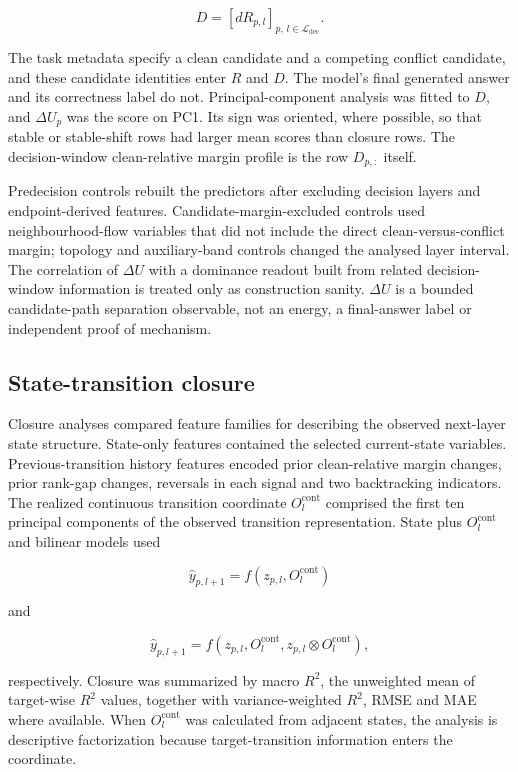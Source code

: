 \documentclass[12pt]{article}
\begin{document}
\[
D=\left[dR_{p,l}\right]_{p,\,l\in\mathcal{L}_{\mathrm{dec}}}.
\]

The task metadata specify a clean candidate and a competing conflict candidate, and these candidate identities enter \(R\) and \(D\). The model's final generated answer and its correctness label do not. Principal-component analysis was fitted to \(D\), and \(\Delta U_p\) was the score on PC1. Its sign was oriented, where possible, so that stable or stable-shift rows had larger mean scores than closure rows. The decision-window clean-relative margin profile is the row \(D_{p,:}\) itself.

Predecision controls rebuilt the predictors after excluding decision layers and endpoint-derived features. Candidate-margin-excluded controls used neighbourhood-flow variables that did not include the direct clean-versus-conflict margin; topology and auxiliary-band controls changed the analysed layer interval. The correlation of \(\Delta U\) with a dominance readout built from related decision-window information is treated only as construction sanity. \(\Delta U\) is a bounded candidate-path separation observable, not an energy, a final-answer label or independent proof of mechanism.

\subsection*{State-transition closure}

Closure analyses compared feature families for describing the observed next-layer state structure. State-only features contained the selected current-state variables. Previous-transition history features encoded prior clean-relative margin changes, prior rank-gap changes, reversals in each signal and two backtracking indicators. The realized continuous transition coordinate \(O_l^{\mathrm{cont}}\) comprised the first ten principal components of the observed transition representation. State plus \(O_l^{\mathrm{cont}}\) and bilinear models used

\[
\hat y_{p,l+1}=f(z_{p,l},O_l^{\mathrm{cont}})
\]

and

\[
\hat y_{p,l+1}=f(z_{p,l},O_l^{\mathrm{cont}},z_{p,l}\otimes O_l^{\mathrm{cont}}),
\]

respectively. Closure was summarized by macro \(R^2\), the unweighted mean of target-wise \(R^2\) values, together with variance-weighted \(R^2\), RMSE and MAE where available. When \(O_l^{\mathrm{cont}}\) was calculated from adjacent states, the analysis is descriptive factorization because target-transition information enters the coordinate.
\end{document}
